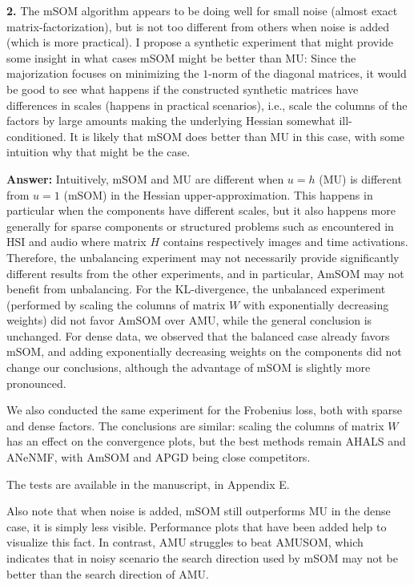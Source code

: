 \documentclass[10pt]{article} %
\newcommand{\answer}[1]{{\textbf{Answer:} \color{blue} #1}}
\begin{document}
\textbf{2.} The mSOM algorithm appears to be doing well for small noise (almost exact matrix-factorization), but is not too different from others when noise is added (which is more practical). I propose a synthetic experiment that might provide some insight in what cases mSOM might be better than MU: Since the majorization focuses on minimizing the $1$-norm of the diagonal matrices, it would be good to see what happens if the constructed synthetic matrices have differences in scales (happens in practical scenarios), i.e., scale the columns of the factors by large amounts making the underlying Hessian somewhat ill-conditioned. It is likely that mSOM does better than MU in this case, with some intuition why that might be the case.

\answer{Intuitively, mSOM and MU are different when $u=h$ (MU) is different from $u=1$ (mSOM) in the Hessian upper-approximation. This happens in particular when the components have different scales, but it also happens more generally for sparse components or structured problems such as encountered in HSI and audio where matrix $H$ contains respectively images and time activations. Therefore, the unbalancing experiment may not necessarily provide significantly different results from the other experiments, and in particular, AmSOM may not benefit from unbalancing. For the KL-divergence, the unbalanced experiment (performed by scaling the columns of matrix $W$ with exponentially decreasing weights) did not favor AmSOM over AMU, while the general conclusion is unchanged. For dense data, we observed that the balanced case already favors mSOM, and adding exponentially decreasing weights on the components did not change our conclusions, although the advantage of mSOM is slightly more pronounced. 

We also conducted the same experiment for the Frobenius loss, both with sparse and dense factors. The conclusions are similar: scaling the columns of matrix $W$ has an effect on the convergence plots, but the best methods remain AHALS and ANeNMF, with AmSOM and APGD being close competitors.

The tests are available in the manuscript, in Appendix E.

Also note that when noise is added, mSOM still outperforms MU in the dense case, it is simply less visible. Performance plots that have been added help to visualize this fact. In contrast, AMU struggles to beat AMUSOM, which indicates that in noisy scenario the search direction used by mSOM may not be better than the search direction of AMU.}
\end{document}

